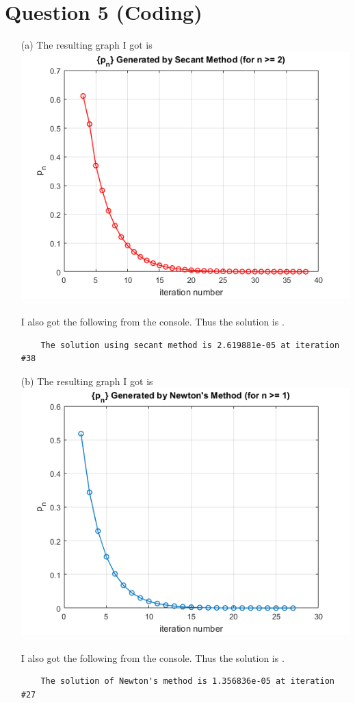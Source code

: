 \documentclass[11pt]{article}
\newcommand*{\boxtex}[1]{\framebox{#1}}
\begin{document}
\section*{Question 5 (Coding)}
\begin{itemize}
	\item [(a)]
	The resulting graph I got is\\
	\includegraphics{secant.png}\\\\
	I also got the following from the console. Thus the solution is \boxtex{$ 2.620\times 10^{-5} $}.
	\begin{verbatim}
	The solution using secant method is 2.619881e-05 at iteration #38
	\end{verbatim}\pagebreak
	
	\item [(b)]
	The resulting graph I got is \\
	\includegraphics{newton.png}\\\\
	I also got the following from the console. Thus the solution is \boxtex{$ 1.357\times 10^{-5} $}.
	\begin{verbatim}
	The solution of Newton's method is 1.356836e-05 at iteration #27
	\end{verbatim}\pagebreak
	

\end{itemize}
\end{document}

